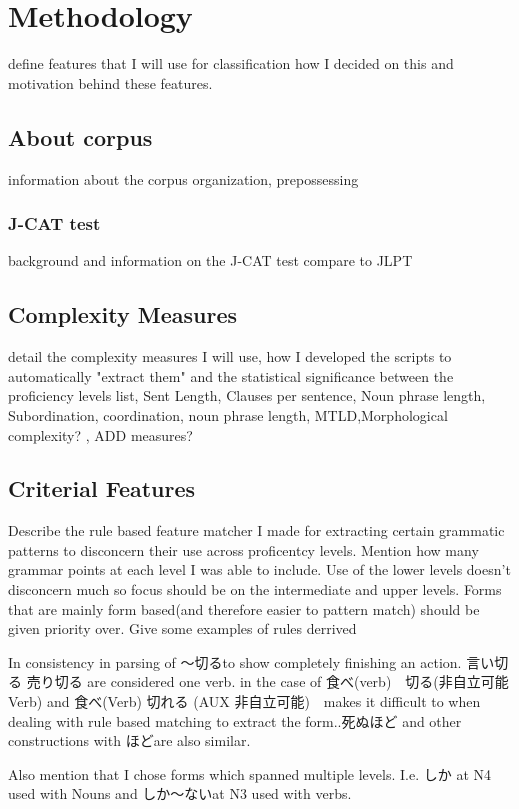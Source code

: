 \chapter{Methodology}
define  features that I will use for classification how I decided on this and motivation behind these features.


\section{About corpus}
information about the corpus organization, prepossessing

\subsection{J-CAT test}
background and information on the J-CAT test compare to JLPT

\section{Complexity Measures}
detail the complexity measures I will use, how I developed the scripts to automatically "extract them" and the statistical significance between the proficiency levels
list, Sent Length, Clauses per sentence, Noun phrase length,  Subordination, coordination, noun phrase length, MTLD,Morphological complexity? , ADD measures?

\section{Criterial Features}
Describe the rule based feature matcher I made for extracting certain grammatic patterns to disconcern their use
across proficentcy levels. Mention how many grammar points at each level I was able to include. Use of the lower
levels doesn't disconcern much so focus should be on the intermediate and upper levels.  Forms that are mainly form
based(and therefore easier to pattern match) should be given priority over. Give some examples of rules derrived

In consistency in parsing of 〜切るto show completely finishing an action. 言い切る 売り切る are considered one verb. in the
case of 食べ(verb)　切る(非自立可能Verb) and 食べ(Verb) 切れる (AUX 非自立可能)　makes it difficult to when dealing with rule based
matching to extract the form..死ぬほど and other constructions with ほどare also similar.

Also mention that I chose forms which spanned multiple levels. I.e. しか at N4 used with Nouns and しか〜ないat N3 used
with verbs.

